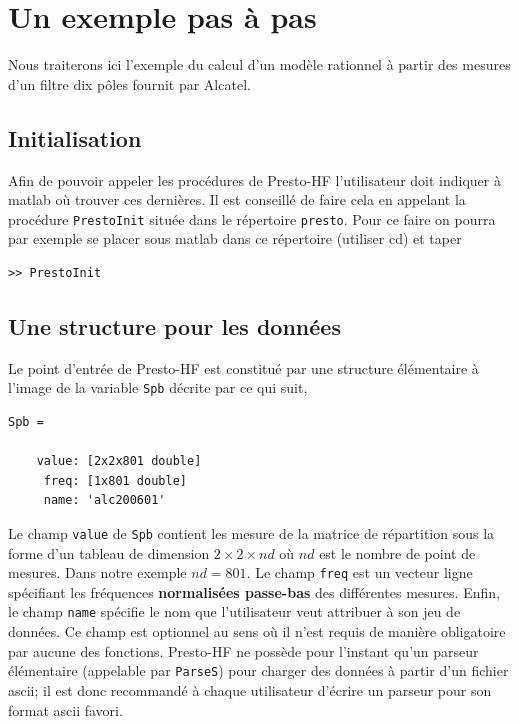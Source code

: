 \documentclass[12]{article}
\def\prest{Presto-HF\xspace}
\begin{document}
\section{Un exemple pas \`a pas}


Nous traiterons ici l'exemple du calcul d'un mod\`ele rationnel \`a partir 
des mesures d'un filtre dix p\^oles fournit par Alcatel. 
\subsection{Initialisation}

Afin de pouvoir appeler les proc\'edures de \prest l'utilisateur doit
indiquer \`a matlab o\`u trouver ces derni\`eres. Il est conseill\'e de
faire cela en appelant la proc\'edure \verb+PrestoInit+ situ\'ee dans le
r\'epertoire \verb+presto+. Pour ce faire on pourra par exemple se placer
sous matlab dans ce r\'epertoire (utiliser cd) et taper
\begin{verbatim}
>> PrestoInit
\end{verbatim}
 
\subsection{Une structure pour les donn\'ees}
\label{sec:donnees}
Le point
d'entr\'ee de \prest est constitu\'e par une structure \'el\'ementaire 
\`a l'image de la variable \verb+Spb+ d\'ecrite par ce qui suit,
\begin{verbatim}
Spb = 

    value: [2x2x801 double]
     freq: [1x801 double]
     name: 'alc200601'
\end{verbatim}
Le champ \verb+value+ de \verb+Spb+ contient les mesure de la matrice
de r\'epartition sous la forme d'un tableau de dimension $2 \times 2
\times nd$ o\`u $nd$ est le nombre de point de mesures. Dans notre
exemple $nd=801$. Le champ \verb+freq+ est un vecteur
ligne sp\'ecifiant les fr\'equences {\bf normalis\'ees passe-bas}
des diff\'erentes mesures. Enfin, le champ \verb+name+ sp\'ecifie le nom que
l'utilisateur veut attribuer \`a son jeu de donn\'ees. Ce champ est
optionnel au sens o\`u il n'est requis de mani\`ere obligatoire par aucune 
des fonctions. \prest ne poss\`ede pour l'instant qu'un
parseur \'el\'ementaire (appelable par \verb+ParseS+) pour charger des
donn\'ees \`a partir d'un fichier ascii; il est donc recommand\'e
\`a chaque utilisateur d'\'ecrire un parseur pour son format
ascii favori. 
\end{document}
